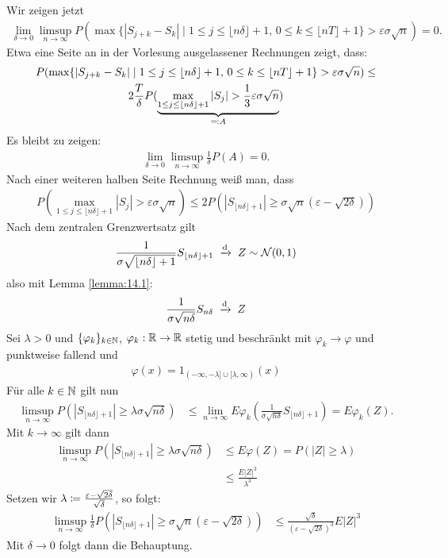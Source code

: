 \documentclass[a4paper,twoside,DIV15,BCOR12mm]{scrbook}
\begin{document}
\begin{beweis}
Wir zeigen jetzt
\begin{align*}
\lim_{\delta\to0} \limsup_{n\to\infty}
P(\max\{ |S_{j+k}-S_k|  \mid 1\le j \le  \lfloor n\delta\rfloor +1 ,\, 0\le k\le \lfloor nT\rfloor +1\} > \varepsilon\sigma\sqrt n) = 0.
\end{align*}
Etwa eine Seite an in der Vorlesung ausgelassener Rechnungen zeigt, dass:
\begin{multline*}
P(\max\{ |S_{j+k}-S_k|  \mid 1\le j \le  \lfloor n\delta\rfloor +1 ,\, 0\le k\le \lfloor nT\rfloor +1\} > \varepsilon\sigma\sqrt n) \le \\
2 \frac T\delta P(\underbrace{\max_{1\le j\le \lfloor n\delta\rfloor +1}|S_j| > \frac 13 \varepsilon \sigma \sqrt n}_{\ad A})
\end{multline*}
Es bleibt zu zeigen:
\begin{align*}
\lim_{\delta \to0} \limsup_{n\to\infty} \frac 1 \delta P(A) = 0.
\end{align*}
Nach einer weiteren halben Seite Rechnung weiß man, dass
\begin{align*}
P(\max_{1\le j\le \lfloor n\delta\rfloor +1}|S_j| >  \varepsilon \sigma \sqrt n) \le 2P(|S_{\lfloor n\delta \rfloor +1}| \ge \sigma\sqrt n (\varepsilon - \sqrt{2\delta}))
\end{align*}
Nach dem zentralen Grenzwertsatz gilt
\begin{align*}
\frac 1{\sigma \sqrt{\lfloor n\delta \rfloor +1}} S_{\lfloor n\delta \rfloor +1} \tonach{d} Z\sim \mathcal N(0,1)
\end{align*}
also mit Lemma \ref{lemma:14.1}:
\begin{align*}
\frac 1{\sigma \sqrt{n\delta}} S_{n\delta} \tonach{d} Z
\end{align*}
Sei $\lambda > 0$ und $\{\varphi_k\}_{k\in\mathbb{N}}$, $\varphi_k:\mathbb{R}\to\mathbb{R}$ stetig und beschränkt mit $\varphi_k\to \varphi$ und punktweise fallend und
\begin{align*}
\varphi(x) = 1_{(-\infty,-\lambda]\cup[\lambda,\infty)}(x)
\end{align*}
Für alle $k\in\mathbb{N}$ gilt nun
\begin{align*}
\limsup_{n\to\infty} P(|S_{\lfloor n\delta\rfloor + 1}| \ge \lambda \sigma\sqrt{n\delta})
&\le \lim_{n\to\infty} E\varphi_k(\frac1{\sigma\sqrt{n\delta}}S_{\lfloor n\delta\rfloor + 1}) = E\varphi_k(Z).
\end{align*}
Mit $k\to\infty$ gilt dann
\begin{align*}
\limsup_{n\to\infty} P(|S_{\lfloor n\delta\rfloor + 1}| \ge \lambda \sigma\sqrt{n\delta}) 
&\le E\varphi(Z) = P(|Z|\ge \lambda) \\
&\le \frac{E|Z|^3}{\lambda^3}
\end{align*}
Setzen wir $\lambda \da \frac{\varepsilon - \sqrt {2\delta}}{\sqrt{\delta}}$, so folgt:
\begin{align*}
\limsup_{n\to\infty} \frac 1\delta P(|S_{\lfloor n\delta\rfloor + 1}| \ge \sigma\sqrt{n}(\varepsilon - \sqrt{2\delta}))
&\le  \frac{\sqrt\delta}{(\varepsilon - \sqrt{2\delta})^3} E|Z|^3
\end{align*}
Mit $\delta\to0$ folgt dann die Behauptung.
\end{beweis}
\end{document}
